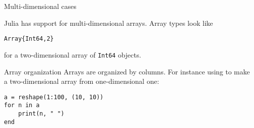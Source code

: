  {Multi-dimensional cases}

Julia has support for multi-dimensional arrays.
Array types look like
\begin{lstlisting}
Array{Int64,2}  
\end{lstlisting}
for a two-dimensional array of \lstinline{Int64} objects.

\begin{block}{Array organization}
  Arrays are organized by columns. For instance using
   to make a two-dimensional array
  from  one-dimensional one:
\begin{lstlisting}
a = reshape(1:100, (10, 10))
for n in a
    print(n, " ")
end
\end{lstlisting}
\end{block}

\begin{comment}
  \Level 1 {Matrix as vector of vectors}

  \begin{block}{Multi-dimensional vectors}
    \label{sl:multi-vector}
    Multi-dimensional is harder with vectors:
    \begin{lstlisting}
      vector<float> row(20);
      vector<vector<float>> rows(10,row);
      // alternative:
      vector<vector<float>> rows(10);
      for ( auto &row : rows )
      row = vector<float>(20);
    \end{lstlisting}
    Create a row vector, then store 10 copies of that:\\
    vector of vectors.
  \end{block}

  This is not the best implementation of a matrix, for instance because
  the elements are not contiguous. However, let's continue with it for a moment.

  \begin{block}{Matrix class}
    \label{sl:matrix-class}
    \verbatimsnippet{matrixclassdef}
  \end{block}

  \begin{exercise}
    \label{ex:matrixclass-rowcol1}
    Write \n{rows()} and \n{cols()} methods for this class that return
    the number of rows ad columns respectively.
  \end{exercise}

  \begin{exercise}
    \label{ex:matrix-methods}
    Add methods such as \n{transpose}, \n{scale} to your matrix class.


\end{comment}
